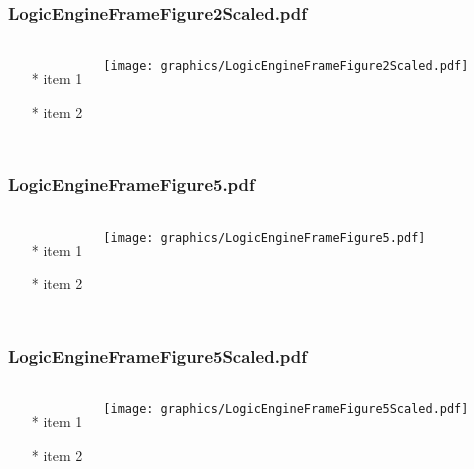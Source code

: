 \begin{frame} \frametitle{LogicEngineFrameFigure2Scaled.pdf}
    \begin{columns}[c]
        \begin{itemize}
            \item[*] item 1
            \item[*] item 2
        \end{itemize}
        \begin{minipage}{\linewidth}
            \begin{center}
            \texttt{[image: graphics/LogicEngineFrameFigure2Scaled.pdf]}
            \label{gfx:LogicEngineFrameFigure2Scaled.pdf}
            \end{center}
        \end{minipage}
    \end{columns}
\end{frame}
\begin{frame} \frametitle{LogicEngineFrameFigure5.pdf}
    \begin{columns}[c]
        \begin{itemize}
            \item[*] item 1
            \item[*] item 2
        \end{itemize}
        \begin{minipage}{\linewidth}
            \begin{center}
            \texttt{[image: graphics/LogicEngineFrameFigure5.pdf]}
            \label{gfx:LogicEngineFrameFigure5.pdf}
            \end{center}
        \end{minipage}
    \end{columns}
\end{frame}
\begin{frame} \frametitle{LogicEngineFrameFigure5Scaled.pdf}
    \begin{columns}[c]
        \begin{itemize}
            \item[*] item 1
            \item[*] item 2
        \end{itemize}
        \begin{minipage}{\linewidth}
            \begin{center}
            \texttt{[image: graphics/LogicEngineFrameFigure5Scaled.pdf]}
            \label{gfx:LogicEngineFrameFigure5Scaled.pdf}
            \end{center}
        \end{minipage}
    \end{columns}
\end{frame}
